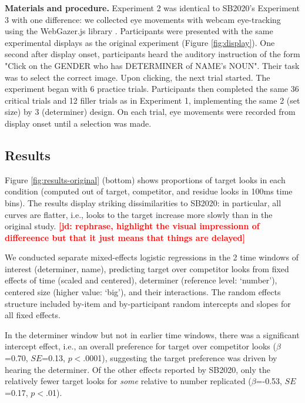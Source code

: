 \documentclass[10pt,letterpaper]{article}
\newcommand{\figref}[1]{Figure \ref{#1}}
\newcommand{\expref}[1]{Experiment #1}
\newcommand{\jd}[1]{\textcolor{Red}{\textbf{[jd: #1]}}}
\begin{document}
\textbf{Materials and procedure.} \expref{2} was identical to SB2020's \expref{3} with one difference: we collected eye movements with webcam eye-tracking using the WebGazer.js library \cite{papoutsaki2016webgazer}. Participants were presented with the same experimental displays as the original experiment (\figref{fig:display}). One second after display onset, participants heard the auditory instruction of the form "Click on the GENDER who has DETERMINER of NAME's NOUN". Their task was to select the correct image. Upon clicking, the next trial started. The experiment began with 6 practice trials. Participants then completed the same 36 critical trials and 12 filler trials as in \expref{1}, implementing the same 2 (set size) by 3 (determiner) design.  On each trial, eye movements were recorded from display onset until a selection was made.


\subsection{Results}

\figref{fig:results-original} (bottom) shows proportions of target looks in each condition (computed out of target, competitor, and residue looks in 100ms time bins). The results display striking dissimilarities to SB2020: in particular, all curves are flatter, i.e., looks to the target increase more slowly than in the original study. \jd{rephrase, highlight the visual impressionn of differeence but that it just means that things are delayed}

We conducted separate mixed-effects logistic regressions in the 2 time windows of interest (determiner, name), predicting target over competitor looks from fixed effects of time (scaled and centered), determiner (reference level: `number'), centered size (higher value: `big'), and their interactions. The random effects structure included by-item and by-participant random intercepts and slopes for all  fixed effects.

In the determiner window but not in earlier time windows, there was a significant intercept effect, i.e., an overall preference for target over competitor looks ($\beta$=0.70, $SE$=0.13, $p<$.0001), suggesting the target preference was driven by hearing the determiner. Of the other effects reported by SB2020, only the relatively fewer target looks for \emph{some} relative to number replicated  ($\beta$=-0.53, $SE$=0.17, $p<$.01).
\end{document}
